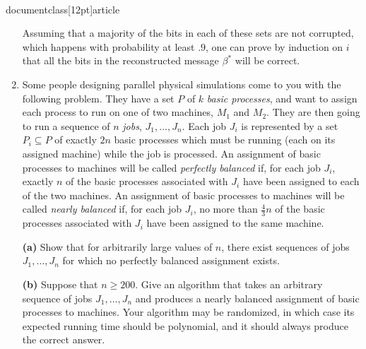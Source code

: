 \\documentclass[12pt]{article}
\begin{document}
\begin{enumerate}
{Assuming that a majority of the bits in each of these sets
are not corrupted, which happens with probability at least $.9$,
one can prove by induction on $i$ that all the bits in
the reconstructed message $\beta^*$ will be correct.

}


\item 

Some people designing parallel physical simulations
come to you with the following problem.
They have a set $P$ of $k$ {\em basic processes}, and
want to assign each process to run on one of two machines,
$M_1$ and $M_2$.
They are then going to run a sequence of $n$ {\em jobs},
$J_1, \ldots, J_n$.
Each job $J_i$ is represented by a set $P_i \subseteq P$
of exactly $2n$ basic processes which must
be running (each on its assigned machine) while the job is processed.
An assignment of basic processes to machines will be
called {\em perfectly balanced} if, for each job $J_i$,
exactly $n$ of the basic processes associated
with $J_i$ have been assigned to each of the two machines.
An assignment of basic processes to machines will be
called {\em nearly balanced} if, for each job $J_i$,
no more than $\frac43 n$ of the basic processes associated
with $J_i$ have been assigned to the same machine.

{\bf (a)} Show that for arbitrarily large values of $n$,
there exist sequences of jobs $J_1, \ldots, J_n$
for which no perfectly balanced assignment exists.

{\bf (b)} Suppose that $n \geq 200$.
Give an algorithm that takes an arbitrary sequence
of jobs $J_1, \ldots, J_n$ and produces a nearly balanced
assignment of basic processes to machines.
Your algorithm may be randomized, in which case its
expected running time should be polynomial, and it
should always produce the correct answer.

\end{enumerate}
\end{document}
